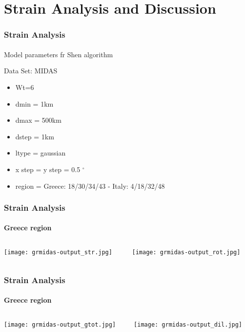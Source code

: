 \section{Strain Analysis and Discussion}
 
\graphicspath{{Chapter4/Figs/}}

\begin{frame}
 \frametitle{Strain Analysis}
 \framesubtitle{}
 \label{ch4:}
 
  Model parameters fr Shen algorithm
  
  Data Set: MIDAS
  \begin{itemize}
    \item Wt=6
    \item dmin = 1km
    \item dmax = 500km
    \item dstep = 1km
    \item ltype = gaussian
    \item x step = y step = 0.5 $^{\circ}$
    \item region = Greece: 18/30/34/43 -  Italy: 4/18/32/48
  \end{itemize}

\end{frame}
\note{}

\begin{frame}
 \frametitle{Strain Analysis}
 \framesubtitle{Greece region}
 \label{ch4:}
   
  \begin{columns}
    \begin{column}{0.5\textwidth}
      
      \texttt{[image: grmidas-output\_str.jpg]}   
    \end{column}
    \begin{column}{0.5\textwidth}
    \begin{center}
      
      \texttt{[image: grmidas-output\_rot.jpg]}     
    \end{center}
    \end{column}
  \end{columns}

\end{frame}
\note{}

\begin{frame}
 \frametitle{Strain Analysis}
 \framesubtitle{Greece region}
 \label{ch4:}
   
  \begin{columns}
    \begin{column}{0.5\textwidth}
      \texttt{[image: grmidas-output\_gtot.jpg]}   
    \end{column}
    \begin{column}{0.5\textwidth}
    \begin{center}
      \texttt{[image: grmidas-output\_dil.jpg]}     
    \end{center}
    \end{column}
  
  \end{columns}

\end{frame}
\note{}


